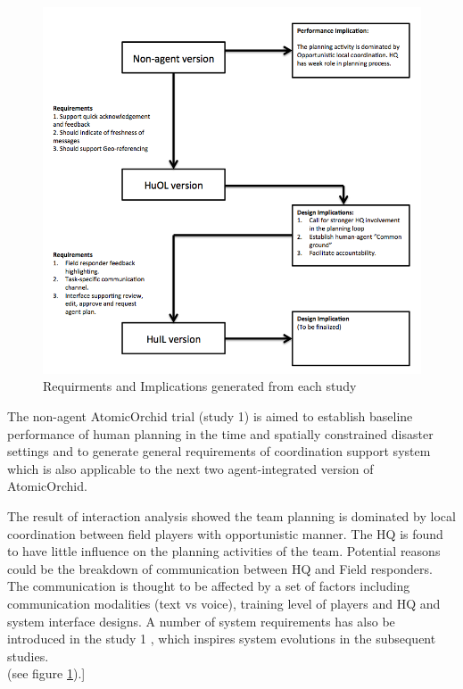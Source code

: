 \begin{figure}[h]
  \centering
  \includegraphics[width=1\textwidth]{img/conclusion/connections}
  \caption{Requirments and Implications generated from each study}
  \label{fig:connections}
\end{figure}

The non-agent AtomicOrchid trial (study 1) is aimed to establish baseline performance of human planning in the time and spatially constrained disaster settings and to generate general requirements of coordination support system which is also applicable to the next two agent-integrated version of AtomicOrchid. 

The result of interaction analysis showed the team planning is dominated by local coordination between field players with opportunistic manner. The HQ is found to have little influence on the planning activities of the team. Potential reasons could be the breakdown of communication between HQ and Field responders. The communication is thought to be affected by a set of factors including communication modalities (text vs voice), training level of players and HQ and system interface designs. A number of system requirements has also be introduced in the study 1 , which inspires system evolutions in the subsequent studies. \\

(see figure \ref{fig:connections}).]\\

